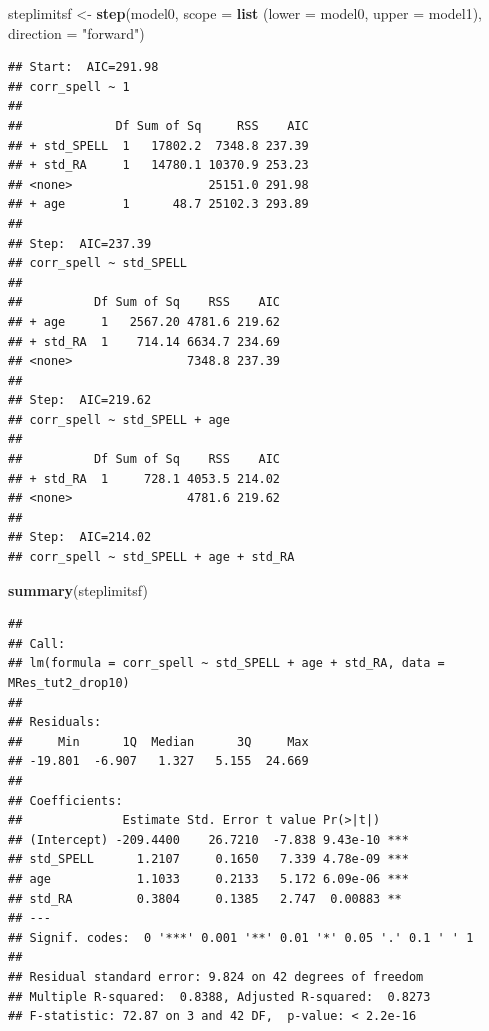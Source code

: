 \documentclass[
]{book}
\newenvironment{Shaded}{\begin{snugshade}}{\end{snugshade}}
\newcommand{\AttributeTok}[1]{\textcolor[rgb]{0.13,0.29,0.53}{#1}}
\newcommand{\FunctionTok}[1]{\textcolor[rgb]{0.13,0.29,0.53}{\textbf{#1}}}
\newcommand{\NormalTok}[1]{#1}
\newcommand{\OtherTok}[1]{\textcolor[rgb]{0.56,0.35,0.01}{#1}}
\newcommand{\StringTok}[1]{\textcolor[rgb]{0.31,0.60,0.02}{#1}}
\begin{document}
\begin{Shaded}
\begin{Highlighting}[]
\NormalTok{steplimitsf }\OtherTok{\textless{}{-}} \FunctionTok{step}\NormalTok{(model0, }\AttributeTok{scope =} \FunctionTok{list}\NormalTok{ (}\AttributeTok{lower =}\NormalTok{ model0, }\AttributeTok{upper =}\NormalTok{ model1), }\AttributeTok{direction =} \StringTok{"forward"}\NormalTok{)}
\end{Highlighting}
\end{Shaded}

\begin{verbatim}
## Start:  AIC=291.98
## corr_spell ~ 1
## 
##             Df Sum of Sq     RSS    AIC
## + std_SPELL  1   17802.2  7348.8 237.39
## + std_RA     1   14780.1 10370.9 253.23
## <none>                   25151.0 291.98
## + age        1      48.7 25102.3 293.89
## 
## Step:  AIC=237.39
## corr_spell ~ std_SPELL
## 
##          Df Sum of Sq    RSS    AIC
## + age     1   2567.20 4781.6 219.62
## + std_RA  1    714.14 6634.7 234.69
## <none>                7348.8 237.39
## 
## Step:  AIC=219.62
## corr_spell ~ std_SPELL + age
## 
##          Df Sum of Sq    RSS    AIC
## + std_RA  1     728.1 4053.5 214.02
## <none>                4781.6 219.62
## 
## Step:  AIC=214.02
## corr_spell ~ std_SPELL + age + std_RA
\end{verbatim}

\begin{Shaded}
\begin{Highlighting}[]
\FunctionTok{summary}\NormalTok{(steplimitsf)}
\end{Highlighting}
\end{Shaded}

\begin{verbatim}
## 
## Call:
## lm(formula = corr_spell ~ std_SPELL + age + std_RA, data = MRes_tut2_drop10)
## 
## Residuals:
##     Min      1Q  Median      3Q     Max 
## -19.801  -6.907   1.327   5.155  24.669 
## 
## Coefficients:
##              Estimate Std. Error t value Pr(>|t|)    
## (Intercept) -209.4400    26.7210  -7.838 9.43e-10 ***
## std_SPELL      1.2107     0.1650   7.339 4.78e-09 ***
## age            1.1033     0.2133   5.172 6.09e-06 ***
## std_RA         0.3804     0.1385   2.747  0.00883 ** 
## ---
## Signif. codes:  0 '***' 0.001 '**' 0.01 '*' 0.05 '.' 0.1 ' ' 1
## 
## Residual standard error: 9.824 on 42 degrees of freedom
## Multiple R-squared:  0.8388, Adjusted R-squared:  0.8273 
## F-statistic: 72.87 on 3 and 42 DF,  p-value: < 2.2e-16
\end{verbatim}
\end{document}
